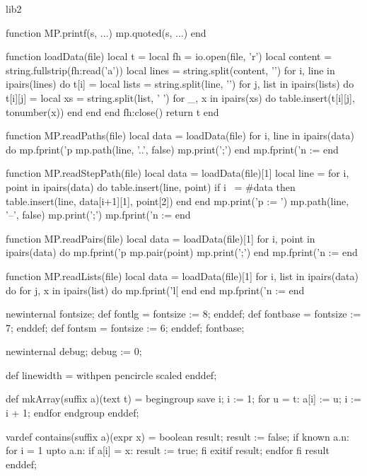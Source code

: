 \startenvironment lib2

\startluacode

function MP.printf(s, ...)
  mp.quoted(s, ...)
end

function loadData(file)
  local t = {}
  local fh = io.open(file, 'r')
  local content = string.fullstrip(fh:read('a'))
  local lines = string.split(content, '\n\n')
  for i, line in ipairs(lines) do
    t[i] = {}
    local lists = string.split(line, '\n')
    for j, list in ipairs(lists) do
      t[i][j] = {}
      local xs = string.split(list, ' ')
      for _, x in ipairs(xs) do
        table.insert(t[i][j], tonumber(x))
      end
    end
  end
  fh:close()
  return t
end

function MP.readPaths(file)
  local data = loadData(file)
  for i, line in ipairs(data) do
    mp.fprint('p%
    mp.path(line, '..', false)
    mp.print(';')
  end
  mp.fprint('n := %
end

function MP.readStepPath(file)
  local data = loadData(file)[1]
  local line = {}
  for i, point in ipairs(data) do
    table.insert(line, point)
    if i ~= #data then
      table.insert(line, {data[i+1][1], point[2]})
    end
  end
  mp.print('p := ')
  mp.path(line, '--', false)
  mp.print(';')
  mp.fprint('n := %
end

function MP.readPairs(file)
  local data = loadData(file)[1]
  for i, point in ipairs(data) do
    mp.fprint('p%
    mp.pair(point)
    mp.print(';')
  end
  mp.fprint('n := %
end

function MP.readLists(file)
  local data = loadData(file)[1]
  for i, list in ipairs(data) do
    for j, x in ipairs(list) do
      mp.fprint('l[%
    end
  end
  mp.fprint('n := %
end

\stopluacode

\startMPextensions

newinternal fontsize;
def fontlg = fontsize := 8; enddef;
def fontbase = fontsize := 7; enddef;
def fontsm = fontsize := 6; enddef;
fontbase;

newinternal debug;
debug := 0;

def linewidth = withpen pencircle scaled enddef;

def mkArray(suffix a)(text t) = begingroup
  save i; i := 1;
  for u = t:
    a[i] := u;
    i := i + 1;
  endfor
endgroup enddef;

vardef contains(suffix a)(expr x) =
  boolean result;
  result := false;
  if known a.n:
    for i = 1 upto a.n:
      if a[i] = x:
        result := true;
      fi
      exitif result;
    endfor
  fi
  result
enddef;

